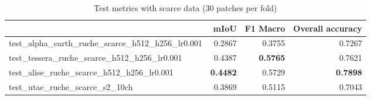 \begin{table}
\caption{Test metrics with scarce data (30 patches per fold)}
\label{tab:test_metrics_scarce}
\begin{tabular}{lrrr}
\toprule
 & mIoU & F1 Macro & Overall accuracy \\
\midrule
test\_alpha\_earth\_ruche\_scarce\_h512\_h256\_lr0.001 & 0.2867 & 0.3755 & 0.7267 \\
test\_tessera\_ruche\_scarce\_h512\_h256\_lr0.001 & 0.4387 & \textbf{0.5765} & 0.7621 \\
test\_alise\_ruche\_scarce\_h512\_h256\_lr0.001 & \textbf{0.4482} & 0.5729 & \textbf{0.7898} \\
test\_utae\_ruche\_scarce\_s2\_10ch & 0.3869 & 0.5115 & 0.7043 \\
\bottomrule
\end{tabular}
\end{table}
